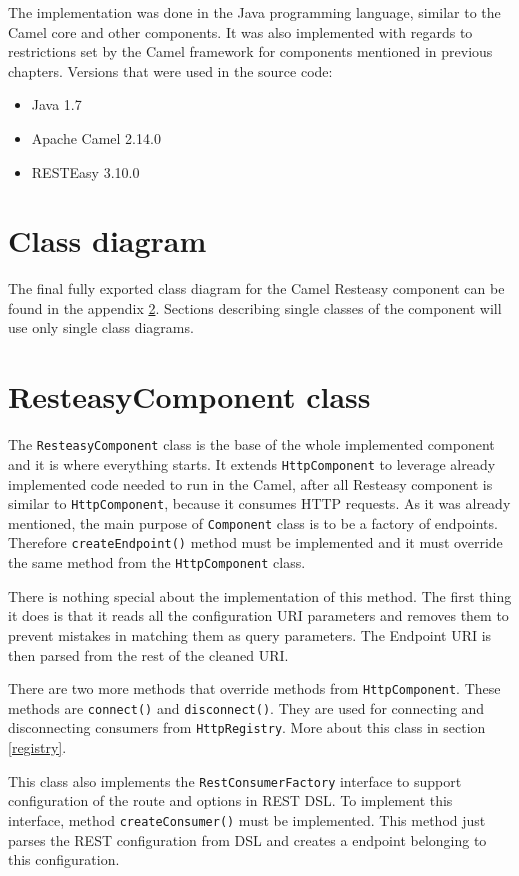 \documentclass[12pt,final,oneside]{fithesis2}
\begin{document}
The implementation was done in the Java programming language, similar to the Camel core and other components. It was also implemented with regards to restrictions set by the Camel framework for components mentioned in previous chapters. Versions that were used in the source code:
\begin{itemize}
\item
Java 1.7

\item
Apache Camel 2.14.0

\item
RESTEasy 3.10.0
\end{itemize}

\section{Class diagram}
The final fully exported class diagram for the Camel Resteasy component can be found in the appendix \ref{}. Sections describing single classes of the component will use only single class diagrams.

\section{ResteasyComponent class}
The \texttt{ResteasyComponent} class is the base of the whole implemented component and it is where everything starts. It extends \texttt{HttpComponent} to leverage already implemented code needed to run in the Camel, after all Resteasy component is similar to \texttt{HttpComponent}, because it consumes HTTP requests. As it was already mentioned, the main purpose of \texttt{Component} class is to be a factory of endpoints. Therefore \texttt{createEndpoint()} method must be implemented and it must override the same method from the \texttt{HttpComponent} class.

There is nothing special about the implementation of this method. The first thing it does is that it reads all the configuration URI parameters and removes them to prevent mistakes in matching them as query parameters. The Endpoint URI is then parsed from the rest of the cleaned URI.

There are two more methods that override methods from \texttt{HttpComponent}. These methods are \texttt{connect()} and \texttt{disconnect()}. They are used for connecting and disconnecting consumers from \texttt{HttpRegistry}. More about this class in section \ref{registry}. 

This class also implements the \texttt{RestConsumerFactory} interface to support configuration of the route and options in REST DSL. To implement this interface, method \texttt{createConsumer()} must be implemented. This method just parses the REST configuration from DSL and creates a endpoint belonging to this configuration.
\end{document}
